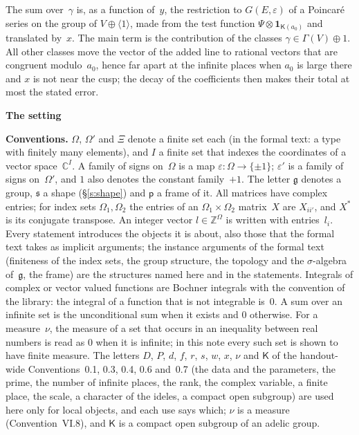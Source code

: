 \documentclass[11pt,a4paper]{article}
\newcommand{\m}[1]{\mbox{$#1$}}        %
\newcommand{\sect}[2]{\refstepcounter{section}\label{#2}\par\addvspace{19pt plus 4pt minus 2pt}\Needspace{7\baselineskip}%
  \noindent\llap{{\fontsize{13.2}{16}\selectfont\bfseries\color{inkfaint}\thesection}\hspace{9pt}}%
  {\fontsize{13.2}{16}\selectfont\bfseries\color{ink}#1}\par\nopagebreak\vspace{-1pt}}
\theoremstyle{plainx}
\theoremstyle{uprightx}
\newenvironment{conventions}{\par\addvspace{5pt}\noindent\textbf{Conventions.}\enspace\ignorespaces}{\par\addvspace{3pt}}
\newcommand{\CC}{\mathbb{C}}
\newcommand{\ZZ}{\mathbb{Z}}
\newcommand{\fs}{\mathfrak{s}}
\newcommand{\fp}{\mathsf{p}}
\begin{document}
The sum over~$\gamma$ is, as a function of~$y$, the restriction to $G(E,\varepsilon)$ of a Poincaré series on the
group of \m{V\oplus\langle1\rangle}, made from the test function \m{\Psi\otimes\mathbf{1}_{\mathsf{K}(a_0)}} and translated
by~$x$. The main term is the contribution of the classes \m{\gamma\in\Gamma(V)\oplus1}. All other classes move the
vector of the added line to rational vectors that are congruent modulo~$a_0$, hence far apart at the infinite places
when $a_0$ is large there and $x$ is not near the cusp; the decay of the coefficients then makes their total at most
the stated error.

\sect{The setting}{s:setting}
\begin{conventions}\label{c:conventions}
$\Omega$, $\Omega'$ and $\Xi$ denote a finite set each (in the formal text: a type with finitely many elements),
and $I$ a finite set that indexes the coordinates of a vector space~$\CC^{I}$. A family of signs on~$\Omega$ is a
map $\varepsilon\colon\Omega\to\{\pm1\}$; $\varepsilon'$ is a family of signs on~$\Omega'$, and $1$ also denotes
the constant family~$+1$. The letter $\mathfrak{g}$ denotes a group, $\fs$ a shape (§\ref{s:shape}) and $\fp$ a frame of it.
All matrices have complex entries; for index sets $\Omega_1,\Omega_2$ the entries of an
\m{\Omega_1\times\Omega_2} matrix~$X$ are $X_{ii'}$, and $X^{*}$ is its conjugate transpose. An integer vector
\m{l\in\ZZ^{\Omega}} is written with entries~$l_i$. Every statement introduces the objects it is about, also those
that the formal text takes as implicit arguments; the instance arguments of the formal text (finiteness of the
index sets, the group structure, the topology and the $\sigma$-algebra of~$\mathfrak{g}$, the frame) are the structures named
here and in the statements. Integrals of complex or vector valued functions are Bochner integrals with the
convention of the library: the integral of a function that is not integrable is~$0$. A sum over an infinite set is
the unconditional sum when it exists and $0$ otherwise. For a measure~$\nu$, the measure of a set that occurs in
an inequality between real numbers is read as $0$ when it is infinite; in this note every such set is shown to
have finite measure. The letters $D$, $P$, $d$, $f$, $r$, $s$, $w$, $x$, $\nu$ and $\mathsf K$ of the handout-wide Conventions~0.1, 0.3, 0.4, 0.6 and~0.7
(the data and the parameters, the prime, the number of infinite places, the rank, the complex variable, a finite place, the scale, a character of the ideles, a
compact open subgroup) are used here only for local objects, and each use says which; $\nu$ is a measure (Convention~VI.8), and $\mathsf K$ is a compact open
subgroup of an adelic group.
\end{conventions}
\end{document}
